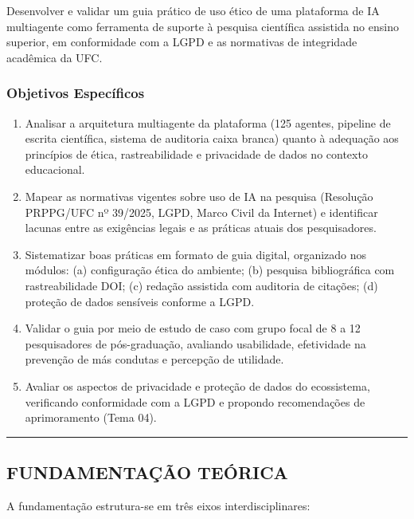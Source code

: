 \documentclass[
  brazilian,
  12pt,
]{article}
\begin{document}
Desenvolver e validar um guia prático de uso ético de uma plataforma de
IA multiagente como ferramenta de suporte à pesquisa científica
assistida no ensino superior, em conformidade com a LGPD e as normativas
de integridade acadêmica da UFC.

\subsubsection{Objetivos Específicos}\label{objetivos-especuxedficos}

\begin{enumerate}
\def\labelenumi{\arabic{enumi}.}
\item
  Analisar a arquitetura multiagente da plataforma (125 agentes,
  pipeline de escrita científica, sistema de auditoria caixa branca)
  quanto à adequação aos princípios de ética, rastreabilidade e
  privacidade de dados no contexto educacional.
\item
  Mapear as normativas vigentes sobre uso de IA na pesquisa (Resolução
  PRPPG/UFC nº 39/2025, LGPD, Marco Civil da Internet) e identificar
  lacunas entre as exigências legais e as práticas atuais dos
  pesquisadores.
\item
  Sistematizar boas práticas em formato de guia digital, organizado nos
  módulos: (a) configuração ética do ambiente; (b) pesquisa
  bibliográfica com rastreabilidade DOI; (c) redação assistida com
  auditoria de citações; (d) proteção de dados sensíveis conforme a
  LGPD.
\item
  Validar o guia por meio de estudo de caso com grupo focal de 8 a 12
  pesquisadores de pós-graduação, avaliando usabilidade, efetividade na
  prevenção de más condutas e percepção de utilidade.
\item
  Avaliar os aspectos de privacidade e proteção de dados do ecossistema,
  verificando conformidade com a LGPD e propondo recomendações de
  aprimoramento (Tema 04).
\end{enumerate}

\begin{center}\rule{0.5\linewidth}{0.5pt}\end{center}

\subsection{FUNDAMENTAÇÃO TEÓRICA}\label{fundamentauxe7uxe3o-teuxf3rica}

A fundamentação estrutura-se em três eixos interdisciplinares:
\end{document}
